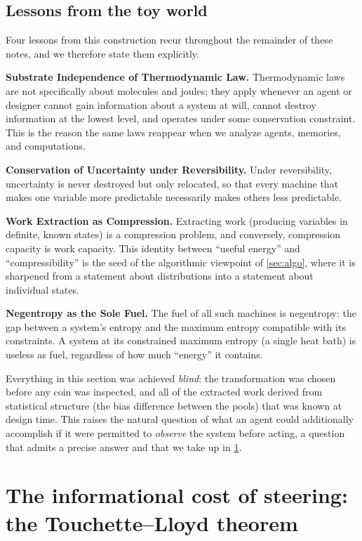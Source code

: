 \documentclass[11pt]{article}
\begin{document}
\subsection{Lessons from the toy world}
\label{sec:cointeach}

Four lessons from this construction recur throughout the remainder of these notes, and we therefore state them explicitly.

\textbf{Substrate Independence of Thermodynamic Law.} Thermodynamic laws are not specifically about molecules and joules; they apply whenever an agent or designer cannot gain information about a system at will, cannot destroy information at the lowest level, and operates under some conservation constraint. This is the reason the same laws reappear when we analyze agents, memories, and computations.

\textbf{Conservation of Uncertainty under Reversibility.} Under reversibility, uncertainty is never destroyed but only relocated, so that every machine that makes one variable more predictable necessarily makes others less predictable.

\textbf{Work Extraction as Compression.} Extracting work (producing variables in definite, known states) is a compression problem, and conversely, compression capacity is work capacity. This identity between ``useful energy'' and ``compressibility'' is the seed of the algorithmic viewpoint of \cref{sec:algo}, where it is sharpened from a statement about distributions into a statement about individual states.

\textbf{Negentropy as the Sole Fuel.} The fuel of all such machines is negentropy: the gap between a system's entropy and the maximum entropy compatible with its constraints. A system at its constrained maximum entropy (a single heat bath) is useless as fuel, regardless of how much ``energy'' it contains.

Everything in this section was achieved \emph{blind}: the transformation was chosen before any coin was inspected, and all of the extracted work derived from statistical structure (the bias difference between the pools) that was known at design time. This raises the natural question of what an agent could additionally accomplish if it were permitted to \emph{observe} the system before acting, a question that admits a precise answer and that we take up in \cref{sec:tl}.
\section{The informational cost of steering: the Touchette--Lloyd theorem}
\label{sec:tl}
\end{document}
